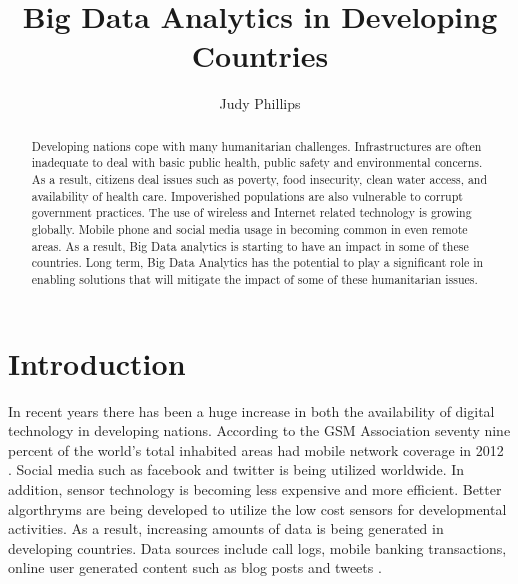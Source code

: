 \documentclass[sigconf]{acmart}
\begin{document}
\title{Big Data Analytics in Developing Countries}


\author{Judy Phillips}









\begin{abstract}
Developing nations cope with many humanitarian challenges. Infrastructures are often inadequate to deal with basic public health, public safety and environmental concerns. As a result, citizens deal issues such as poverty, food insecurity, clean water access, and availability of health care. Impoverished populations are also vulnerable to corrupt government practices. The use of wireless and Internet related technology is growing globally. Mobile phone and social media usage in becoming common in even remote areas.  As a result, Big Data analytics is starting to have an impact in some of these countries. Long term, Big Data Analytics has the potential to play a significant role in enabling solutions that will mitigate the impact of some of these humanitarian issues. 
\end{abstract}



\maketitle



\section{Introduction}

In recent years there has been a huge increase in both the availability of digital technology in developing nations. According to the GSM Association seventy nine percent of the world’s total inhabited areas had mobile network coverage in 2012 \cite{DevEcon}. Social media such as facebook and twitter is being utilized worldwide. In addition, sensor technology is becoming less expensive and more efficient. Better algorthryms are being developed to utilize the low cost sensors for developmental activities. As a result, increasing amounts of data is being generated in developing countries. Data sources include call logs, mobile banking transactions, online user generated content such as blog posts and tweets \cite{GloPls}.
\end{document}
